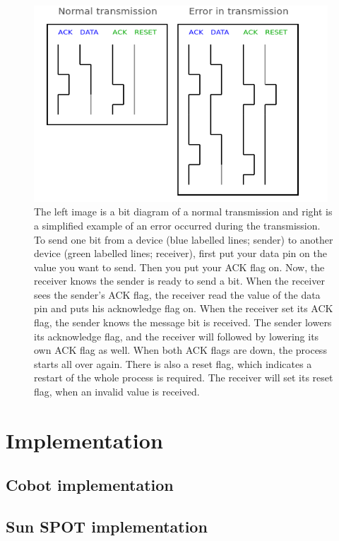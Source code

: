\documentclass[a4paper,10pt]{article} %
\begin{document}
\begin{figure}[H]
\label{fig:handshaking}
\centering
\includegraphics[width=11cm]{img/handshaking.png}
\caption{The left image is a bit diagram of a normal transmission and right is a
simplified example of an error occurred during the transmission. To send one bit
from a device (blue labelled lines; sender) to another device (green labelled
lines; receiver), first put your data pin on the value you want to send. Then
you put your ACK flag on. Now, the receiver knows the sender is ready to send a
bit.  When the receiver sees the sender's ACK flag, the receiver read the value
of the data pin and puts his acknowledge flag on. When the receiver set its ACK
flag, the sender knows the message bit is received. The sender lowers its
acknowledge flag, and the receiver will followed by lowering its own ACK flag as
well. When both ACK flags are down, the process starts all over again. There is
also a reset flag, which indicates a restart of the whole process is required.
The receiver will set its reset flag, when an invalid value is received.}
\end{figure}



\section{Implementation} %
\label{sec:Implementation}

\subsection{Cobot implementation} %
\label{sub:Cobot implementation}


\subsection{Sun SPOT implementation} %
\label{sub:Sun SPOT implementation}
\end{document}

